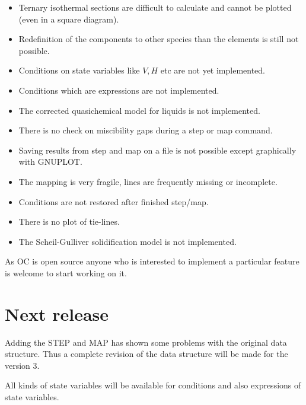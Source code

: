 \documentclass[12pt]{article}
\begin{document}
\begin{itemize}
\item Ternary isothermal sections are difficult to calculate and
  cannot be plotted (even in a square diagram).

\item Redefinition of the components to other species than the
  elements is still not possible.

\item Conditions on state variables like $V, H$ etc are not yet
  implemented.

\item Conditions which are expressions are not implemented.

\item The corrected quasichemical model for liquids is not
  implemented.

\item There is no check on miscibility gaps during a step or map
  command.

\item Saving results from step and map on a file is not possible
  except graphically with GNUPLOT.

\item The mapping is very fragile, lines are frequently missing or
  incomplete.

\item Conditions are not restored after finished step/map.

\item There is no plot of tie-lines.

\item The Scheil-Gulliver solidification model is not implemented.

\end{itemize}

As OC is open source anyone who is interested to implement a
particular feature is welcome to start working on it.

\section{Next release}

Adding the STEP and MAP has shown some problems with the original data
structure.  Thus a complete revision of the data structure will be
made for the version 3.  

All kinds of state variables will be available for conditions and also
expressions of state variables.
\end{document}
